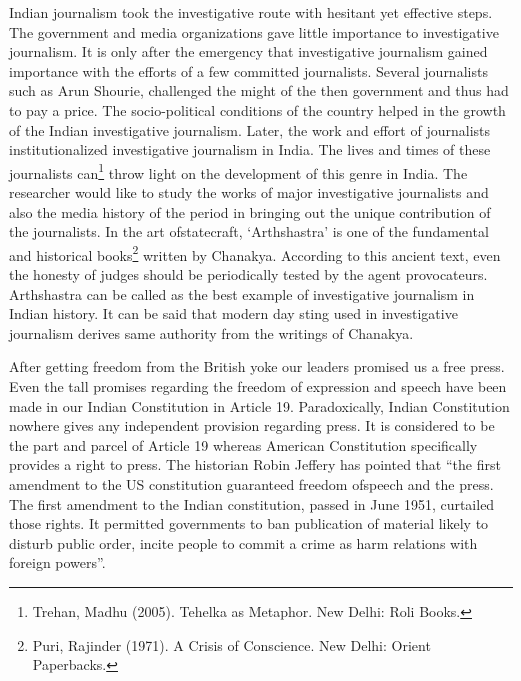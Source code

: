\setcounter{figure}{0}
\setcounter{table}{0}
\setcounter{footnote}{0}


\begin{multicols}{2}


\noi
Indian journalism took the investigative route with hesitant yet effective steps. The government
and media organizations gave little importance to investigative journalism. It is only after the
emergency that investigative journalism gained importance with the efforts of a few committed
journalists. Several journalists such as Arun Shourie, challenged the might of the then
government and thus had to pay a price. The socio-political conditions of the country helped in
the growth of the Indian investigative journalism. Later, the work and effort of journalists
institutionalized investigative journalism in India. The lives and times of these journalists can\footnote{Trehan, Madhu (2005). Tehelka as Metaphor. New Delhi: Roli Books.}
throw light on the development of this genre in India. The researcher would like to study the
works of major investigative journalists and also the media history of the period in bringing
out the unique contribution of the journalists. In the art ofstatecraft, ‘Arthshastra’ is one of the
fundamental and historical books\footnote{Puri, Rajinder (1971). A Crisis of Conscience. New Delhi: Orient Paperbacks.} written by Chanakya. According to this ancient text, even
the honesty of judges should be periodically tested by the agent provocateurs. Arthshastra can
be called as the best example of investigative journalism in Indian history. It can be said that
modern day sting used in investigative journalism derives same authority from the writings of
Chanakya.

\vspace{-.1cm}

\noi
After getting freedom from the British yoke our leaders promised us a free press. Even the tall
promises regarding the freedom of expression and speech have been made in our Indian
Constitution in Article 19. Paradoxically, Indian Constitution nowhere gives any independent
provision regarding press. It is considered to be the part and parcel of Article 19 whereas
American Constitution specifically provides a right to press. The historian Robin Jeffery has
pointed that “the first amendment to the US constitution guaranteed freedom ofspeech and the
press. The first amendment to the Indian constitution, passed in June 1951, curtailed those
rights. It permitted governments to ban publication of material likely to disturb public order,
incite people to commit a crime as harm relations with foreign powers”.


\end{multicols}
